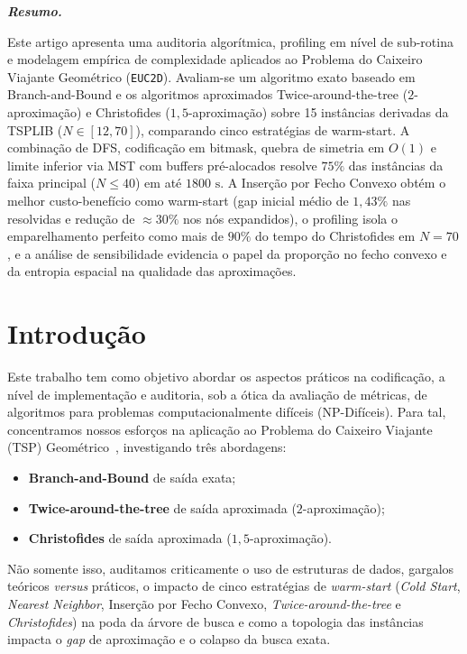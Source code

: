 \documentclass[12pt,a4paper]{article}
\newenvironment{sbcresumo}{%
    \begin{list}{}{%
        \setlength{\leftmargin}{0.8cm}%
        \setlength{\rightmargin}{0.8cm}%
        \setlength{\listparindent}{0pt}%
        \setlength{\itemindent}{0pt}%
        \setlength{\parsep}{0pt}%
        \setlength{\topsep}{6pt}%
    }%
    \item\relax\itshape\noindent\textbf{Resumo.}\hspace{0.4em}\ignorespaces
}{\end{list}}
\renewcommand{\_}{\origunderscore\hspace{0pt}}
\begin{document}
\begin{sbcresumo}
Este artigo apresenta uma auditoria algorítmica, \textup{profiling} em nível de sub-rotina e modelagem empírica de complexidade aplicados ao Problema do Caixeiro Viajante Geométrico (\texttt{EUC\_2D}). Avaliam-se um algoritmo exato baseado em \textup{Branch-and-Bound} e os algoritmos aproximados \textup{Twice-around-the-tree} ($2$-aproximação) e \textup{Christofides} ($1{,}5$-aproximação) sobre 15 instâncias derivadas da TSPLIB ($N \in [12, 70]$), comparando cinco estratégias de \textup{warm-start}. A combinação de DFS, codificação em \textup{bitmask}, quebra de simetria em $O(1)$ e limite inferior via MST com buffers pré-alocados resolve $75\%$ das instâncias da faixa principal ($N \le 40$) em até $1800\text{ s}$. A Inserção por Fecho Convexo obtém o melhor custo-benefício como \textup{warm-start} (\textup{gap} inicial médio de $1{,}43\%$ nas resolvidas e redução de $\approx 30\%$ nos nós expandidos), o \textup{profiling} isola o emparelhamento perfeito como mais de $90\%$ do tempo do \textup{Christofides} em $N=70$, e a análise de sensibilidade evidencia o papel da proporção no fecho convexo e da entropia espacial na qualidade das aproximações.
\end{sbcresumo}

\vspace{6pt}

\section{Introdução}

Este trabalho tem como objetivo abordar os aspectos práticos na codificação, a nível de implementação e auditoria, sob a ótica da avaliação de métricas, de algoritmos para problemas computacionalmente difíceis (NP-Difíceis). Para tal, concentramos nossos esforços na aplicação ao Problema do Caixeiro Viajante (TSP) Geométrico~\cite{vimieiro2026slides, vimieiro2026tp2}, investigando três abordagens: 
\begin{itemize}
  \item \textbf{Branch-and-Bound} de saída exata;
  \item \textbf{Twice-around-the-tree} de saída aproximada ($2$-aproximação);
  \item \textbf{Christofides} de saída aproximada ($1{,}5$-aproximação).
\end{itemize}

Não somente isso, auditamos criticamente o uso de estruturas de dados, gargalos teóricos \textit{versus} práticos, o impacto de cinco estratégias de \textit{warm-start} (\textit{Cold Start}, \textit{Nearest Neighbor}, Inserção por Fecho Convexo, \textit{Twice-around-the-tree} e \textit{Christofides}) na poda da árvore de busca e como a topologia das instâncias impacta o \textit{gap} de aproximação e o colapso da busca exata.
\end{document}
